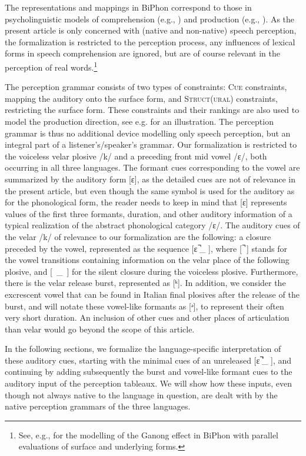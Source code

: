 \documentclass[output=paper,colorlinks,citecolor=brown]{langscibook}
\begin{document}
The representations and mappings in BiPhon correspond to those in psycholinguistic models of comprehension (e.g., \cite{McQueenCutler1997}) and production (e.g., \cite{Levelt1989}). As the present article is only concerned with (native and non-native) speech perception, the formalization is restricted to the perception process, any influences of lexical forms in speech comprehension are ignored, but are of course relevant in the perception of real words.\footnote{See, e.g., \citet{Boersma2009} for the modelling of the Ganong effect in BiPhon with parallel evaluations of surface and underlying forms.}


The perception grammar consists of two types of constraints: \textsc{Cue} constraints, mapping the auditory onto the surface form, and \textsc{Struct(ural}) constraints, restricting the surface form. These constraints and their rankings are also used to model the production direction, see e.g. \citet{BoersmaHamann2009} for an illustration. The perception grammar is thus no additional device modelling only speech perception, but an integral part of a listener's/speaker's grammar.
Our formalization is restricted to the voiceless velar plosive /k/ and a preceding front mid vowel /ɛ/, both occurring in all three languages. The formant cues corresponding to the vowel are summarized by the auditory form [ɛ], as the detailed cues are not of relevance in the present article, but even though the same symbol is used for the auditory as for the phonological form, the reader needs to keep in mind that [ɛ] represents values of the first three formants, duration, and other auditory information of a typical realization of the abstract phonological category /ɛ/. The auditory cues of the velar /k/ of relevance to our formalization are the following: a closure preceded by the vowel, represented as the sequence [ɛ ̚\_ ], where [  ̚  ] stands for the vowel transitions containing information on the velar place of the following plosive, and \mbox{[ \_ ]} for the silent closure during the voiceless plosive. Furthermore, there is the velar release burst, represented as [ᵏ]. In addition, we consider the excrescent vowel that can be found in Italian final plosives after the release of the burst, and will notate these vowel-like formants as [ᵊ], to represent their often very short duration. An inclusion of other cues and other places of articulation than velar would go beyond the scope of this article.

In the following sections, we formalize the language-specific interpretation of these auditory cues, starting with the minimal cues of an unreleased [ɛ   ̚̚\_ ], and continuing by adding subsequently the burst and vowel-like formant cues to the auditory input of the perception tableaux. We will show how these inputs, even though not always native to the language in question, are dealt with by the native perception grammars of the three languages. 
\end{document}
